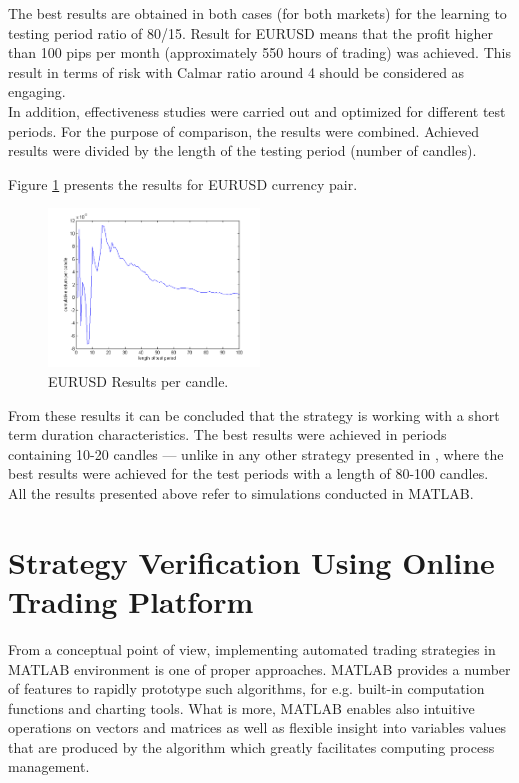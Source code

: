 \documentclass[runningheads,a4paper]{llncs}
\begin{document}
The best results are obtained in both cases (for both markets) for the learning to testing period ratio of 80/15. Result for EURUSD means that the profit higher than 100 pips per month (approximately 550 hours of trading) was achieved. This result in terms of risk with Calmar ratio around 4 should be considered as engaging.\\

In addition, effectiveness studies were carried out and optimized for different test periods. For the purpose of comparison, the results were combined. Achieved results were divided by the length of the testing period (number of candles). 

Figure \ref{fig:fig10} presents the results for EURUSD currency pair.

\begin{figure}[h!]
\centering
\includegraphics[width = 0.5\textwidth]{figures/rys10.png}
\caption{EURUSD Results per candle.}
\label{fig:fig10}
\end{figure}
\FloatBarrier
\vspace{-1em}

From these results it can be concluded that the strategy is working with a short term duration characteristics. The best results were achieved in periods containing 10-20 candles --- unlike in any other strategy presented in \cite{Wilinski2014}, where the best results were achieved for the test periods with a length of 80-100 candles.\\
All the results presented above refer to simulations conducted in MATLAB.

\section{Strategy Verification Using Online Trading Platform}
From a conceptual point of view, implementing automated trading strategies in MATLAB environment is one of proper approaches. MATLAB provides a number of features to rapidly prototype such algorithms, for e.g. built-in computation functions and charting tools. What is more, MATLAB enables also intuitive operations on vectors and matrices as well as flexible insight into variables values that are produced by the algorithm which greatly facilitates computing process management.\\
\end{document}

